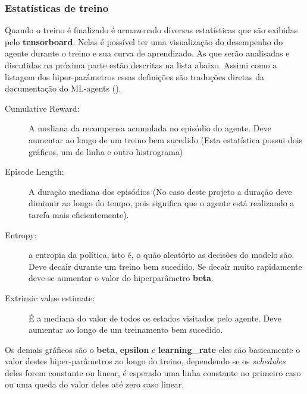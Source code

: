 \subsubsection*{Estatísticas de treino}
Quando o treino é finalizado é armazenado diversas estatísticas que são exibidas pelo \textbf{tensorboard}. Nelas é possível ter uma visualização do desempenho do agente durante o treino e sua curva de aprendizado. As que serão analisadas e discutidas na próxima parte estão descritas na lista abaixo. Assimi como a listagem dos hiper-parâmetros essas definições são traduções diretas da documentação do ML-agents ().

\begin{description}
   \item [Cumulative Reward:] A mediana da recompensa acumulada no episódio do agente. Deve aumentar ao longo de um treino bem sucedido (Esta estatística possui dois gráficos, um de linha e outro histrograma)
   \item [Episode Length:] A duração mediana dos episódios (No caso deste projeto a duração deve diminuir ao longo do tempo, pois significa que o agente está realizando a tarefa mais eficientemente).
   \item [Entropy:] a entropia da política, isto é, o quão aleatório as decisões do modelo são. Deve decair durante um treino bem sucedido. Se decair muito rapidamente deve-se aumentar o valor do hiperparâmetro \textbf{beta}.
   \item [Extrinsic value estimate:] É a mediana do valor de todos os estados visitados pelo agente. Deve aumentar ao longo de um treinamento bem sucedido.
\end{description}

Os demais gráficos são o \textbf{beta}, \textbf{epsilon} e \textbf{learning\_rate} eles são basicamente o valor destes hiper-parâmetros ao longo do treino, dependendo se os \textit{schedules} deles forem constante ou linear, é esperado uma linha constante no primeiro caso ou uma queda do valor deles até zero caso linear.

